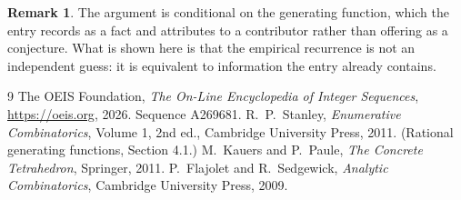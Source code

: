 \documentclass[11pt,a4paper]{article}
\theoremstyle{plain}
\theoremstyle{definition}
\newtheorem{remark}[theorem]{Remark}
\begin{document}
\begin{remark}
The argument is conditional on the generating function, which the entry records as a fact and
attributes to a contributor rather than offering as a conjecture. What is shown here is that
the empirical recurrence is not an independent guess: it is equivalent to information the
entry already contains.
\end{remark}

\begin{thebibliography}{9}
 The OEIS Foundation, \emph{The On-Line Encyclopedia of Integer
Sequences}, \url{https://oeis.org}, 2026. Sequence A269681.
 R.~P.~Stanley, \emph{Enumerative Combinatorics}, Volume 1, 2nd ed.,
Cambridge University Press, 2011. (Rational generating functions, Section 4.1.)
 M.~Kauers and P.~Paule, \emph{The Concrete Tetrahedron}, Springer, 2011.
 P.~Flajolet and R.~Sedgewick, \emph{Analytic Combinatorics}, Cambridge
University Press, 2009.
\end{thebibliography}
\end{document}
